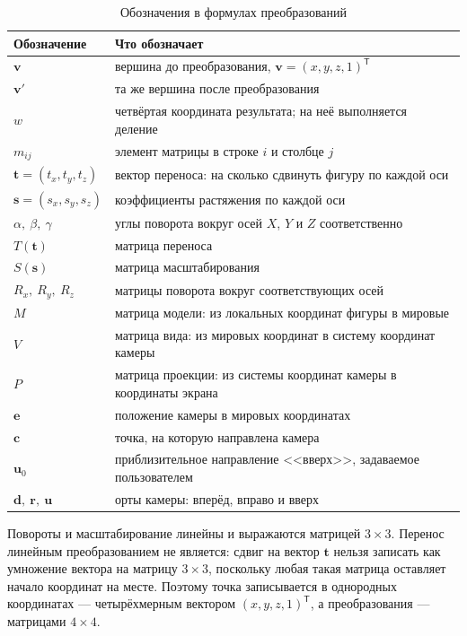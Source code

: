 \documentclass[14pt,a4paper]{extarticle}
\begin{document}
\begin{table}[H]
	\caption{Обозначения в формулах преобразований}
	\label{tab:notation}
	\centering
	\vspace{2mm}
	\begin{tabular}{@{}l p{}@{}}
		\toprule
		Обозначение & Что обозначает \\
		\midrule
		$\mathbf{v}$ & вершина до преобразования, $\mathbf{v} = (x, y, z, 1)^{\mathsf{T}}$ \\
		$\mathbf{v}'$ & та же вершина после преобразования \\
		$w$ & четвёртая координата результата; на неё выполняется деление \\
		$m_{ij}$ & элемент матрицы в строке $i$ и столбце $j$ \\
		\addlinespace
		$\mathbf{t} = (t_x, t_y, t_z)$ & вектор переноса: на сколько сдвинуть фигуру по каждой оси \\
		$\mathbf{s} = (s_x, s_y, s_z)$ & коэффициенты растяжения по каждой оси \\
		$\alpha,\ \beta,\ \gamma$ & углы поворота вокруг осей $X$, $Y$ и $Z$ соответственно \\
		\addlinespace
		$T(\mathbf{t})$ & матрица переноса \\
		$S(\mathbf{s})$ & матрица масштабирования \\
		$R_x,\ R_y,\ R_z$ & матрицы поворота вокруг соответствующих осей \\
		$M$ & матрица модели: из локальных координат фигуры в мировые \\
		$V$ & матрица вида: из мировых координат в систему координат камеры \\
		$P$ & матрица проекции: из системы координат камеры в координаты экрана \\
		\addlinespace
		$\mathbf{e}$ & положение камеры в мировых координатах \\
		$\mathbf{c}$ & точка, на которую направлена камера \\
		$\mathbf{u}_0$ & приблизительное направление <<вверх>>, задаваемое пользователем \\
		$\mathbf{d},\ \mathbf{r},\ \mathbf{u}$ & орты камеры: вперёд, вправо и вверх \\
		\bottomrule
	\end{tabular}
\end{table}

Повороты и масштабирование линейны и выражаются матрицей $3\times3$. Перенос
линейным преобразованием не является: сдвиг на вектор $\mathbf{t}$ нельзя
записать как умножение вектора на матрицу $3\times3$, поскольку любая такая
матрица оставляет начало координат на месте. Поэтому точка записывается в
однородных координатах — четырёхмерным вектором $(x, y, z, 1)^{\mathsf{T}}$, а
преобразования — матрицами $4\times4$.
\end{document}
